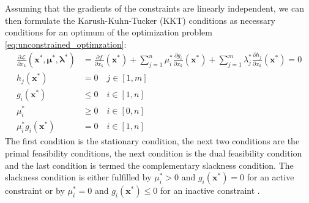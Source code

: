Assuming that the gradients of the constraints are linearly independent, we can then formulate the Karush-Kuhn-Tucker (KKT) conditions as necessary conditions for an optimum of the optimization problem \eqref{eq:unconstrained_optimzation}: 
\begin{align}
    \frac{\partial \mathcal{\mathcal{L}}}{\partial x_k} (\mathbf{x}^*, \pmb{\mu}^*, \pmb{\lambda}^*) &= 
    \frac{\partial f }{\partial x_k} (\mathbf{x}^*) + \sum_{j=1}^n \mu_i^* \frac{\partial g_i}{\partial x_k} (\mathbf{x}^*) + \sum_{j=1}^m \lambda_j^* \frac{\partial h_j}{\partial x_k} (\mathbf{x}^*) = 0 \\
    h_j(\mathbf{x}^*) &= 0 \quad j \in [1,m]\\
    g_i(\mathbf{x}^*) &\le 0 \quad i \in [1,n]\\
    \mu_i^* &\ge 0 \quad i \in [0,n] \\
    \mu_i^* g_i(\mathbf{x}^*) &=0 \quad i \in [1,n]
\end{align}
The first condition is the stationary condition, the next two conditions are the primal feasibility conditions, the next condition is the dual feasibility condition and the last condition is termed the complementary slackness condition. The slackness condition is either fulfilled by $\mu_i^*>0$ and $g_i(\mathbf{x}^*)=0$ for an active constraint or by  $\mu_i^*=0$ and $g_i(\mathbf{x}^*) \le 0$ for an inactive constraint \cite{Christensen2008, Harzheim2014}.

